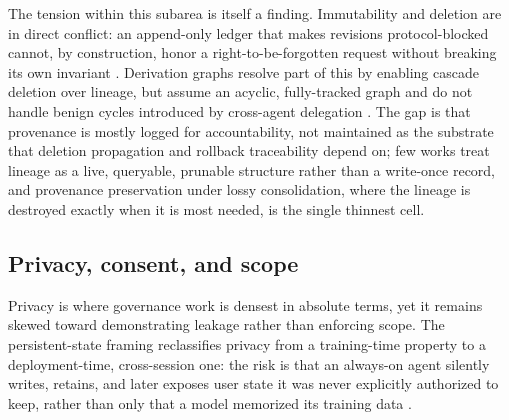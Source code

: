 The tension within this subarea is itself a finding. Immutability and deletion are in direct conflict: an append-only ledger that makes revisions protocol-blocked cannot, by construction, honor a right-to-be-forgotten request without breaking its own invariant \citep{wright2025immutablemem}. Derivation graphs resolve part of this by enabling cascade deletion over lineage, but assume an acyclic, fully-tracked graph and do not handle benign cycles introduced by cross-agent delegation \citep{ouyang2026memlineage}. The gap is that provenance is mostly logged for accountability, not maintained as the substrate that deletion propagation and rollback traceability depend on; few works treat lineage as a live, queryable, prunable structure rather than a write-once record, and provenance preservation under lossy consolidation, where the lineage is destroyed exactly when it is most needed, is the single thinnest cell.

\subsection{Privacy, consent, and scope}

Privacy is where governance work is densest in absolute terms, yet it remains skewed toward demonstrating leakage rather than enforcing scope. The persistent-state framing reclassifies privacy from a training-time property to a deployment-time, cross-session one: the risk is that an always-on agent silently writes, retains, and later exposes user state it was never explicitly authorized to keep, rather than only that a model memorized its training data \citep{carlini2021extractingtrainingdata}.

